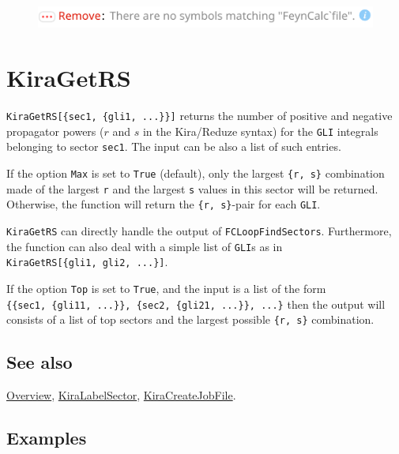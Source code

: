 \documentclass[../FeynHelpersManual.tex]{subfiles}
\begin{document}
\FloatBarrier
\begin{figure}[!ht]
\centering
\includegraphics[width=0.6\linewidth]{img/0eugcbgadj6yz.pdf}
\end{figure}
\FloatBarrier

\hypertarget{kiragetrs}{
\section{KiraGetRS}\label{kiragetrs}}

\texttt{KiraGetRS[\allowbreak{}\{\allowbreak{}sec1,\ \allowbreak{}\{\allowbreak{}gli1,\ \allowbreak{}...\}\}]}
returns the number of positive and negative propagator powers (\(r\) and
\(s\) in the Kira/Reduze syntax) for the \texttt{GLI} integrals
belonging to sector \texttt{sec1}. The input can be also a list of such
entries.

If the option \texttt{Max} is set to \texttt{True} (default), only the
largest \texttt{\{\allowbreak{}r,\ \allowbreak{}s\}} combination made of
the largest \texttt{r} and the largest \texttt{s} values in this sector
will be returned. Otherwise, the function will return the
\texttt{\{\allowbreak{}r,\ \allowbreak{}s\}}-pair for each \texttt{GLI}.

\texttt{KiraGetRS} can directly handle the output of
\texttt{FCLoopFindSectors}. Furthermore, the function can also deal with
a simple list of \texttt{GLI}s as in
\texttt{KiraGetRS[\allowbreak{}\{\allowbreak{}gli1,\ \allowbreak{}gli2,\ \allowbreak{}...\}]}.

If the option \texttt{Top} is set to \texttt{True}, and the input is a
list of the form
\texttt{\{\allowbreak{}\{\allowbreak{}sec1,\ \allowbreak{}\{\allowbreak{}gli11,\ \allowbreak{}...\}\},\ \allowbreak{}\{\allowbreak{}sec2,\ \allowbreak{}\{\allowbreak{}gli21,\ \allowbreak{}...\}\},\ \allowbreak{}...\}}
then the output will consists of a list of top sectors and the largest
possible \texttt{\{\allowbreak{}r,\ \allowbreak{}s\}} combination.

\subsection{See also}

\hyperlink{toc}{Overview}, \hyperlink{kiralabelsector}{KiraLabelSector},
\hyperlink{kiracreatejobfile}{KiraCreateJobFile}.

\subsection{Examples}
\end{document}
